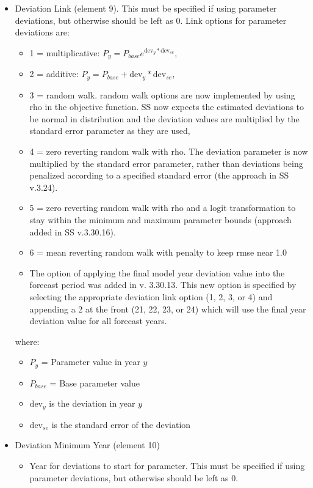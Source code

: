 \begin{itemize}
\item Deviation Link (element 9). This must be specified if using parameter deviations, but otherwise should be left as 0. Link options for parameter deviations are:
	\begin{itemize}
		\item 1 = multiplicative: $P_y = P_{base}e^{\text{dev}_y*\text{dev}_{se}}$,
		\item 2 = additive: $P_y = P_{base} + \text{dev}_y*\text{dev}_{se}$,
		\item 3 = random walk. random walk options are now implemented by using rho in the objective function. SS now expects the estimated deviations to be normal in distribution and the deviation values are multiplied by the standard error parameter as they are used,
		\item 4 = zero reverting random walk with rho. The deviation parameter is now multiplied by the standard error parameter, rather than deviations being penalized according to a specified standard error (the approach in SS v.3.24).
		\item 5 = zero reverting random walk with rho and a logit transformation to stay within the minimum and maximum parameter bounds (approach added in SS v.3.30.16).
		\item 6 = mean reverting random walk with penalty to keep rmse near 1.0
		\item The option of applying the final model year deviation value into the forecast period was added in v. 3.30.13.  This new option is specified by selecting the appropriate deviation link option (1, 2, 3, or 4) and appending a 2 at the front (21, 22, 23, or 24) which will use the final year deviation value for all forecast years. 
	\end{itemize}
	where: 
	\begin{itemize}
	     \item $P_{y}$ = Parameter value in year $y$
         \item $P_{base}$ = Base parameter value
		 \item $\text{dev}_y$ is the deviation in year $y$
		 \item $\text{dev}_{se}$ is the standard error of the deviation
	\end{itemize}
\item Deviation Minimum Year (element 10)
	\begin{itemize}
		\item Year for deviations to start for parameter. This must be specified if using parameter deviations, but otherwise should be left as 0.
	\end{itemize}
	

\end{itemize}
